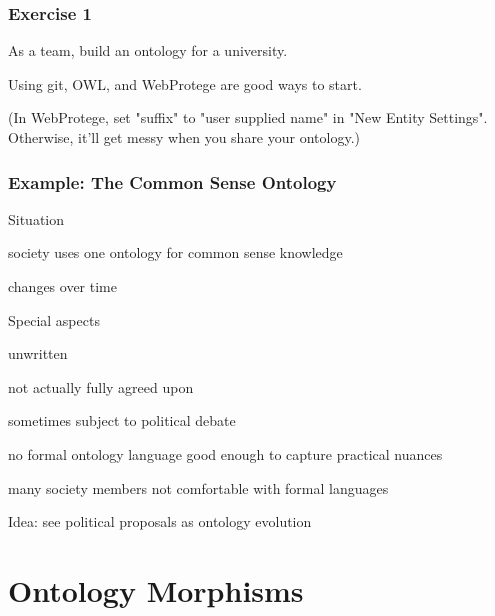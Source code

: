 \begin{frame}\frametitle{Exercise 1}
As a team, build an ontology for a university.

Using git, OWL, and WebProtege are good ways to start.
\bigskip

{\small (In WebProtege, set "suffix" to "user supplied name" in "New Entity Settings". Otherwise, it'll get messy when you share your ontology.)}
\end{frame}

\begin{frame}\frametitle{Example: The Common Sense Ontology}
\begin{blockitems}{Situation}
\item society uses one ontology for common sense knowledge
\item changes over time
\end{blockitems}

\begin{blockitems}{Special aspects}
\item unwritten
\item not actually fully agreed upon
\item sometimes subject to political debate
\item no formal ontology language good enough to capture practical nuances
\item many society members not comfortable with formal languages
\end{blockitems}

Idea: see political proposals as ontology evolution
\end{frame}

\section{Ontology Morphisms}

